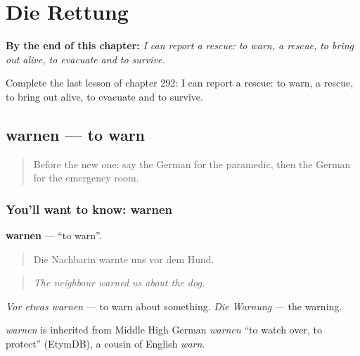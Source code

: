 
\chapter{Die Rettung}
\label{ch:ge-die-rettung}

\begin{chapteropening}
\textbf{By the end of this chapter:} \emph{I can report a rescue: to warn, a rescue, to bring out alive, to evacuate and to survive.}

Complete the last lesson of chapter 292: I can report a rescue: to warn, a rescue, to bring out alive, to evacuate and to survive.
\end{chapteropening}

\section[warnen]{warnen — to warn}

\label{lesson:GE-C292-warnen}



\begin{quote}
Before the new one: say the German for the paramedic, then the German for the emergency room.
\end{quote}

\subsection*{You'll want to know: warnen}
\textbf{warnen} — \textquotedblleft{}to warn\textquotedblright{}.

\begin{quote}
Die Nachbarin warnte uns vor dem Hund.
\end{quote}

\begin{quote}
\emph{The neighbour warned us about the dog.}
\end{quote}

\emph{Vor etwas warnen} — to warn about something. \emph{Die Warnung} — the warning.

\begin{cousinweb}
\emph{warnen} is inherited from Middle High German \emph{warnen} \textquotedblleft{}to watch over, to protect\textquotedblright{} (EtymDB), a cousin of English \emph{warn}.
\end{cousinweb}

